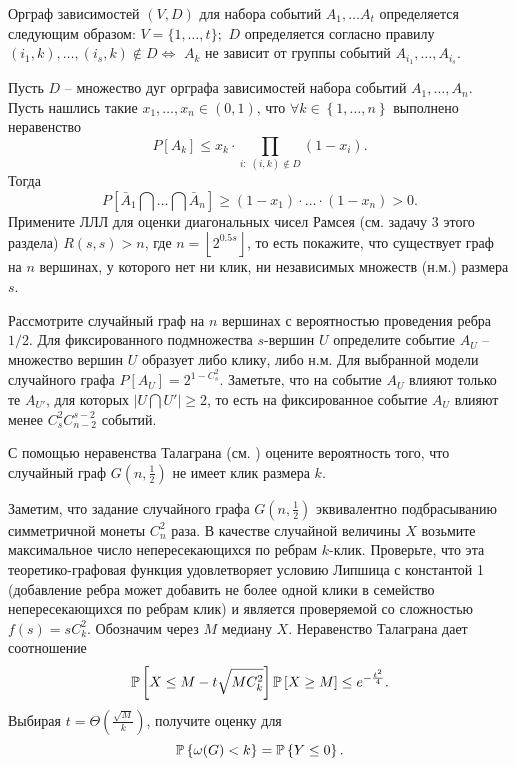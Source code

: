 \begin{problem}
Орграф зависимостей $(V,D)$ для набора событий $A_{1} ,\ldots A_{t} $ определяется следующим образом:
$V=\{ 1,\ldots ,t\};$ $D$ определяется согласно правилу $(i_{1} ,k),\ldots ,(i_{s} ,k)\notin D \Leftrightarrow$ $A_{k} $ не зависит от группы событий $A_{i_{1} } ,\ldots, A_{i_{s} } $.

Пусть $D$ -- множество дуг орграфа зависимостей набора событий $A_{1} ,\ldots, A_{n} $. Пусть нашлись такие $x_{1} ,\ldots ,x_{n} \in (0,1)$, что $\forall k\in \left\{1,\ldots ,n\right\}$ выполнено неравенство
\[P[A_{k} ]\le x_{k}\cdot \prod _{i:\; (i,k)\notin D}(1-x_{i} ) .\] 
Тогда
\[P\left[\bar{A}_{1} \bigcap \ldots \bigcap \bar{A}_{n} \right]\ge (1-x_{1} )\cdot\ldots\cdot (1-x_{n} )>0.\] 
Примените ЛЛЛ для оценки диагональных чисел Рамсея (см. задачу 3 этого раздела) $R(s,s)>n$, где $n=\left\lfloor 2^{0.5s} \right\rfloor $, то есть покажите, что существует граф на $n$ вершинах, у которого нет ни клик, ни независимых множеств (н.м.) размера $s$. 
\end{problem}

\begin{ordre}
Рассмотрите случайный граф на $n$ вершинах с вероятностью проведения ребра $1/2 $. Для фиксированного подмножества $s$-вершин $U$ определите событие $A_{U} $ -- множество вершин $U$ образует либо клику, либо н.м. Для выбранной модели случайного графа $P[A_{U} ]=2^{1-C_{s}^{2} } $. Заметьте, что на событие $A_{U} $ влияют только те $A_{U'} $, для которых $\left|U\bigcap U'\right|\ge 2$, то есть на фиксированное событие $A_{U} $ влияют менее $C_{s}^{2} C_{n-2}^{s-2} $ событий.
\end{ordre}






\begin{problem}

С помощью неравенства Талаграна (см. \cite{15}) оцените вероятность того, что случайный граф 
$G\left( {n,\frac{1}{2}} \right)$ не имеет клик размера $k$.

\end{problem}

\begin{ordre} 
Заметим, что задание случайного графа $G\left( {n,\frac{1}{2}} \right)$ эквивалентно подбрасыванию симметричной монеты $C_n^2 $ раза. В качестве случайной величины $X$ возьмите максимальное число непересекающихся по ребрам $k$-клик. Проверьте, что эта теоретико-графовая 
функция удовлетворяет условию Липшица с константой 1 (добавление ребра может добавить не более одной клики в семейство непересекающихся по ребрам клик) и является проверяемой со сложностью $f(s)= s C_k^2 $. Обозначим через $M$ медиану $X$. Неравенство Талаграна дает соотношение
\[
\mathrm{{\mathbb P}}\left[ {X\le M-t\sqrt {M C_k^2 } } \right]\mathrm{{\mathbb P}}\left[ {X\ge M} \right]\le e^{-\frac{t^2}{4}}.
\]
Выбирая $t=\Theta \left( {\frac{\sqrt M }{k}} \right)$, получите оценку для 
\[
\mathrm{{\mathbb P}}\left\{ {\omega (G)<k} \right\}=\mathrm{{\mathbb P}}\left\{ {Y\le 0} \right\}.
\]
\end{ordre}

